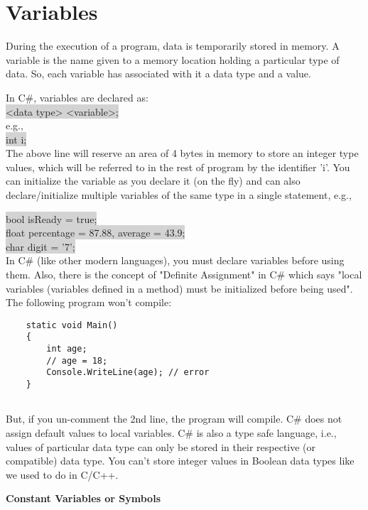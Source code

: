 \section{Variables}
During the execution of a program, data is temporarily stored in memory. A variable is the name given to a
memory location holding a particular type of data. So, each variable has associated with it a data type and a value.

In C\#, variables are declared as:\\

\colorbox{lightgray}{<data type> <variable>;}\\

e.g.,\\
\colorbox{lightgray}{int i;}\\


The above line will reserve an area of 4 bytes in memory to store an integer type values, which will be referred to
in the rest of program by the identifier ’i’. You can initialize the variable as you declare it (on the fly) and can also
declare/initialize multiple variables of the same type in a single statement, e.g.,

\colorbox{lightgray}{bool isReady = true;}\\
\colorbox{lightgray}{float percentage = 87.88, average = 43.9;}\\
\colorbox{lightgray}{char digit = '7';}\\

In C\# (like other modern languages), you must declare variables before using them. Also, there is the concept of
"Definite Assignment" in C\# which says "local variables (variables defined in a method) must be initialized before
being used". The following program won’t compile:

\begin{lstlisting}
    static void Main()
    {
        int age;
        // age = 18;
        Console.WriteLine(age); // error
    }
    
\end{lstlisting}

But, if you un-comment the 2nd line, the program will compile. C\# does not assign default values to local
variables. C\# is also a type safe language, i.e., values of particular data type can only be stored in their respective
(or compatible) data type. You can’t store integer values in Boolean data types like we used to do in C/C++.


\textbf{Constant Variables or Symbols}

